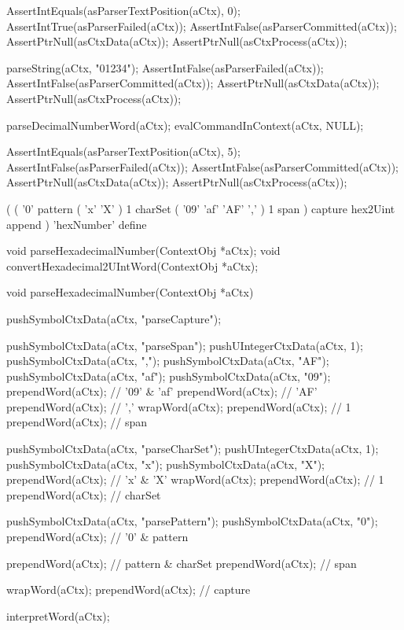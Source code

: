   AssertIntEquals(asParserTextPosition(aCtx), 0);
  AssertIntTrue(asParserFailed(aCtx));
  AssertIntFalse(asParserCommitted(aCtx));
  AssertPtrNull(asCtxData(aCtx));
  AssertPtrNull(asCtxProcess(aCtx));
\stopCTest
\stopTestCase

\startCTest
  parseString(aCtx, "01234");
  AssertIntFalse(asParserFailed(aCtx));
  AssertIntFalse(asParserCommitted(aCtx));
  AssertPtrNull(asCtxData(aCtx));
  AssertPtrNull(asCtxProcess(aCtx));
  
  parseDecimalNumberWord(aCtx);
  evalCommandInContext(aCtx, NULL);
  
  AssertIntEquals(asParserTextPosition(aCtx), 5);
  AssertIntFalse(asParserFailed(aCtx));
  AssertIntFalse(asParserCommitted(aCtx));
  AssertPtrNull(asCtxData(aCtx));
  AssertPtrNull(asCtxProcess(aCtx));
\stopCTest
\stopTestCase
\stopTestSuite

\startTestSuite[parseHexNumberWord]

\starttyping
(
  (
    '0' pattern
    ( 'x' 'X' ) 1 charSet
    ( '09' 'af' 'AF' ',' ) 1 span
  ) capture hex2Uint append
) 'hexNumber' define
\stoptyping

\startCHeader
void parseHexadecimalNumber(ContextObj *aCtx);
void convertHexadecimal2UIntWord(ContextObj *aCtx);
\stopCHeader

\startCCode
void parseHexadecimalNumber(ContextObj *aCtx) {

  pushSymbolCtxData(aCtx, "parseCapture");

  pushSymbolCtxData(aCtx, "parseSpan");
  pushUIntegerCtxData(aCtx, 1);
  pushSymbolCtxData(aCtx, ",");
  pushSymbolCtxData(aCtx, "AF");
  pushSymbolCtxData(aCtx, "af");
  pushSymbolCtxData(aCtx, "09");
  prependWord(aCtx); // '09' & 'af'
  prependWord(aCtx); // 'AF'
  prependWord(aCtx); // ','
  wrapWord(aCtx);
  prependWord(aCtx); // 1
  prependWord(aCtx); // span

  pushSymbolCtxData(aCtx, "parseCharSet");
  pushUIntegerCtxData(aCtx, 1);
  pushSymbolCtxData(aCtx, "x");
  pushSymbolCtxData(aCtx, "X");
  prependWord(aCtx); // 'x' & 'X'
  wrapWord(aCtx);
  prependWord(aCtx); // 1
  prependWord(aCtx); // charSet

  pushSymbolCtxData(aCtx, "parsePattern");
  pushSymbolCtxData(aCtx, "0");
  prependWord(aCtx); // '0' & pattern
  
  prependWord(aCtx); // pattern & charSet
  prependWord(aCtx); // span
  
  wrapWord(aCtx);
  prependWord(aCtx); // capture
  
  interpretWord(aCtx);
}

